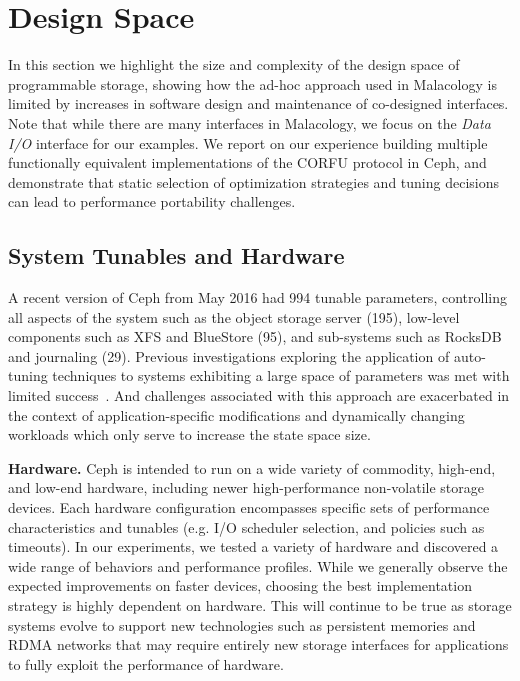 \section{Design Space}
\label{sec:dspace}

In this section we highlight the size and complexity of the design space of
programmable storage, showing how the ad-hoc approach used in Malacology is
limited by increases in software design and maintenance of co-designed
interfaces. Note that while there are many interfaces in Malacology, we focus
on the \emph{Data I/O} interface for our examples. We report on our experience
building multiple functionally equivalent implementations of the CORFU protocol
in Ceph, and demonstrate that static selection of optimization strategies and
tuning decisions can lead to performance portability challenges.

\subsection{System Tunables and Hardware}

A recent version of Ceph from May 2016 had 994 tunable parameters, controlling
all aspects of the system such as the object storage server (195), low-level
components such as XFS and BlueStore (95), and sub-systems such as RocksDB and
journaling (29). Previous investigations exploring the application of
auto-tuning techniques to systems exhibiting a large space of parameters was
met with limited success~\cite{behzad:sc2013-autotuning}. And challenges
associated with this approach are exacerbated in the context of
application-specific modifications and dynamically changing workloads which
only serve to increase the state space size.

{\bf Hardware.} Ceph is intended to run on a wide variety of commodity,
high-end, and low-end hardware, including newer high-performance non-volatile
storage devices. Each hardware configuration encompasses specific sets of
performance characteristics and tunables (e.g. I/O scheduler selection, and
policies such as timeouts). In our experiments, we tested a variety of
hardware and discovered a wide range of behaviors and performance profiles.
While we generally observe the expected improvements on faster devices, choosing the
best implementation strategy is highly dependent on hardware. This will
continue to be true as storage systems evolve to support new technologies such as
persistent memories and RDMA networks that may require entirely new storage
interfaces for applications to fully exploit the performance of hardware.

